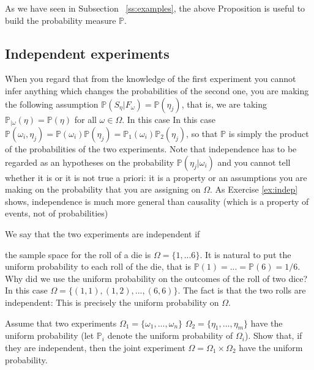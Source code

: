 As we have seen in Subsection ~\ref{ss:examples}, the above Proposition is useful to build the probability measure $\mathbb P$. 

\subsection{Independent experiments}
\label{ss:indep}
When you regard that from the knowledge of the first experiment you cannot infer anything which changes the probabilities of the second one, you are making the following assumption $\mathbb{P}(S_{\eta}|F_{\omega})= \mathbb{P}(\eta_j)$, that is, we are taking $\mathbb P_{|\omega}(\eta) = \mathbb P(\eta)$ for all $\omega \in \Omega$. In this case 
In this case $\mathbb{P}(\omega_i,\eta_j) = \mathbb{P}(\omega_i)\mathbb{P}(\eta_j) = \mathbb{P}_1(\omega_i) \mathbb{P}_2(\eta_j)$, so that $\mathbb{P}$ is simply the product of the probabilities of the two experiments.  Note that independence has to be regarded as an hypotheses on the probability $\mathbb{P}(\eta_j | \omega_i) $ and you cannot tell whether it is or it is not true a priori: it is a property or an assumptions you  are making on the probability that you are assigning on $\Omega$. As Exercise \ref{ex:indep} shows, independence is much more general than causality (which is a property of events, not of probabilities) 

\begin{definition}
We say that the two experiments are independent if 
\end{definition}

\begin{example} the sample space for the roll of a die is $\Omega=\{1,...6\}$. It is natural to put the uniform probability to each roll of the die, that is $\mathbb{P}(1)=...=\mathbb{P}(6)=1/6$. Why did we use the uniform probability on the outcomes of the roll of two dice? In this case $\Omega=\{(1,1),(1,2),...,(6,6)\}$. The fact is that the two rolls are independent:
This is precisely the uniform probability on $\Omega$.

\end{example}

\begin{ExerciseList}
\Exercise Assume that two experiments $\Omega_1=\{\omega_1,...,\omega_n\}$ $\Omega_2=\{\eta_1,...,\eta_m\}$ have the uniform probability (let $\mathbb{P}_i$ denote the uniform probability of $\Omega_i$). Show that, if they are independent, then the joint experiment $\Omega=\Omega_1\times\Omega_2$ have the uniform probability.
\end{ExerciseList}

